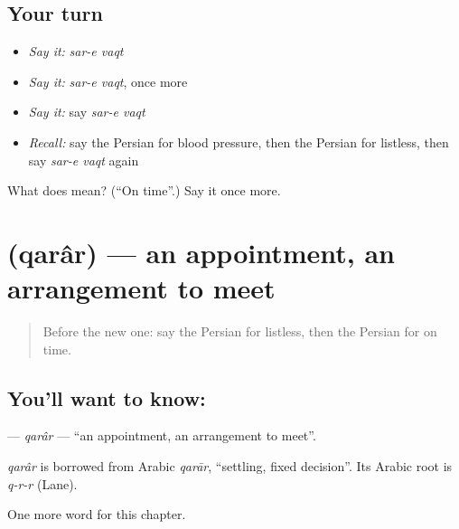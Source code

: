 \subsection*{Your turn}
\begin{itemize}
\raggedright
  \item \emph{Say it:} \emph{sar-e vaqt}
  \item \emph{Say it:} \emph{sar-e vaqt}, once more
  \item \emph{Say it:} say \emph{sar-e vaqt}
  \item \emph{Recall:} say the Persian for blood pressure, then the Persian for listless, then say \emph{sar-e vaqt} again
\end{itemize}

\begin{tcolorbox}[breakable,colback=teal!4,colframe=teal!35!black,title={Before you move on}]
What does   mean? (\textquotedblleft{}On time\textquotedblright{}.) Say it once more.
\end{tcolorbox}
\section[\texorpdfstring{\fa{قرار} (qarâr)}{قرار (qarâr)}]{ (qarâr) — an appointment, an arrangement to meet}

\label{lesson:FA-C191-qarar}



\begin{quote}
Before the new one: say the Persian for listless, then the Persian for on time.
\end{quote}

\subsection*{You'll want to know: }
\textbf{} — \emph{qarâr} — \textquotedblleft{}an appointment, an arrangement to meet\textquotedblright{}.

\begin{cousinweb}
\emph{qarâr} is borrowed from Arabic \emph{qarār}, \textquotedblleft{}settling, fixed decision\textquotedblright{}. Its Arabic root is \emph{q-r-r} (Lane).
\end{cousinweb}

\begin{grammarlens}[title={What you've built}]
One more word for this chapter.
\end{grammarlens}

